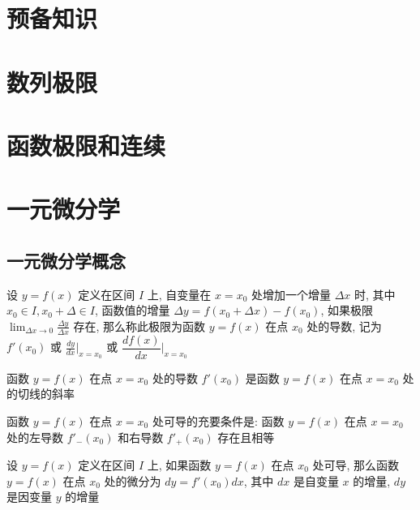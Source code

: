 \chapter{预备知识}
\chapter{数列极限}

\chapter{函数极限和连续}

\chapter{一元微分学}
\section{一元微分学概念}
\begin{definition}[导数]
	设 $y=f(x)$ 定义在区间 $I$ 上, 自变量在 $x=x_{0}$ 处增加一个增量 $\Delta x$ 时, 其中 $x_{0}\in I, x_{0}+\Delta\in I$, 函数值的增量 $\Delta y=f(x_{0}+\Delta x)-f(x_{0})$, 如果极限 $\lim_{\Delta x\to 0}\frac{\Delta y}{\Delta x}$ 存在, 那么称此极限为函数 $y=f(x)$ 在点 $x_{0}$ 处的导数, 记为 $f'(x_{0})$ 或 $\frac{dy}{dx}|_{x=x_{0}}$ 或 $\dfrac{df(x)}{dx}|_{x=x_{0}}$
\end{definition}
\begin{definition}[导数的几何意义]
	函数 $y=f(x)$ 在点 $x=x_{0}$ 处的导数 $f'(x_{0})$ 是函数 $y=f(x)$ 在点 $x=x_{0}$ 处的切线的斜率
\end{definition}

\begin{theorem}[导数存在充要条件]
	函数 $y=f(x)$ 在点 $x=x_{0}$ 处可导的充要条件是: 函数 $y=f(x)$ 在点 $x=x_{0}$ 处的左导数 $f'_{-}(x_{0})$ 和右导数 $f'_{+}(x_{0})$ 存在且相等
\end{theorem}

\begin{definition}[微分]
	设 $y=f(x)$ 定义在区间 $I$ 上, 如果函数 $y=f(x)$ 在点 $x_{0}$ 处可导, 那么函数 $y=f(x)$ 在点 $x_{0}$ 处的微分为 $dy=f'(x_{0})dx$, 其中 $dx$ 是自变量 $x$ 的增量, $dy$ 是因变量 $y$ 的增量
\end{definition}
